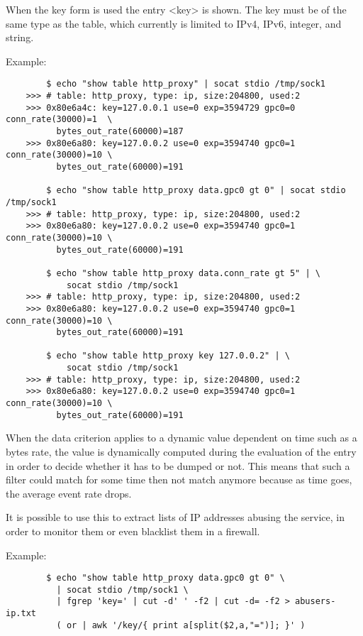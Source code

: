   When the key form is used the entry <key> is shown.  The key must be of the
  same type as the table, which currently is limited to IPv4, IPv6, integer,
  and string.

  Example:
  \begin{verbatim}
        $ echo "show table http_proxy" | socat stdio /tmp/sock1
    >>> # table: http_proxy, type: ip, size:204800, used:2
    >>> 0x80e6a4c: key=127.0.0.1 use=0 exp=3594729 gpc0=0 conn_rate(30000)=1  \
          bytes_out_rate(60000)=187
    >>> 0x80e6a80: key=127.0.0.2 use=0 exp=3594740 gpc0=1 conn_rate(30000)=10 \
          bytes_out_rate(60000)=191

        $ echo "show table http_proxy data.gpc0 gt 0" | socat stdio /tmp/sock1
    >>> # table: http_proxy, type: ip, size:204800, used:2
    >>> 0x80e6a80: key=127.0.0.2 use=0 exp=3594740 gpc0=1 conn_rate(30000)=10 \
          bytes_out_rate(60000)=191

        $ echo "show table http_proxy data.conn_rate gt 5" | \
            socat stdio /tmp/sock1
    >>> # table: http_proxy, type: ip, size:204800, used:2
    >>> 0x80e6a80: key=127.0.0.2 use=0 exp=3594740 gpc0=1 conn_rate(30000)=10 \
          bytes_out_rate(60000)=191

        $ echo "show table http_proxy key 127.0.0.2" | \
            socat stdio /tmp/sock1
    >>> # table: http_proxy, type: ip, size:204800, used:2
    >>> 0x80e6a80: key=127.0.0.2 use=0 exp=3594740 gpc0=1 conn_rate(30000)=10 \
          bytes_out_rate(60000)=191
  \end{verbatim}

  When the data criterion applies to a dynamic value dependent on time such as
  a bytes rate, the value is dynamically computed during the evaluation of the
  entry in order to decide whether it has to be dumped or not. This means that
  such a filter could match for some time then not match anymore because as
  time goes, the average event rate drops.

  It is possible to use this to extract lists of IP addresses abusing the
  service, in order to monitor them or even blacklist them in a firewall.
  
  Example:
  \begin{verbatim}
        $ echo "show table http_proxy data.gpc0 gt 0" \
          | socat stdio /tmp/sock1 \
          | fgrep 'key=' | cut -d' ' -f2 | cut -d= -f2 > abusers-ip.txt
          ( or | awk '/key/{ print a[split($2,a,"=")]; }' )
  \end{verbatim}

